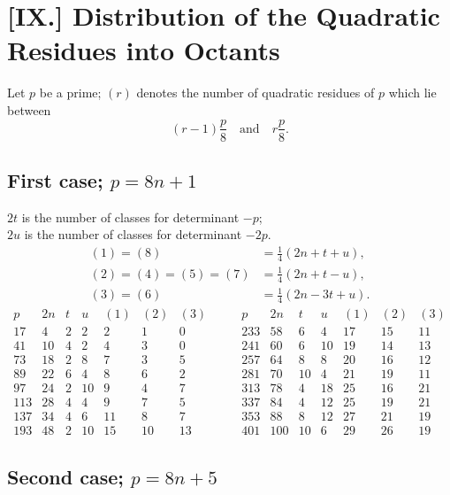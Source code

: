 \documentclass[12pt]{article}
\begin{document}
\section*{[IX.] Distribution of the Quadratic Residues into Octants}

Let $p$ be a prime; $(r)$ denotes the number of quadratic residues of $p$ which lie between
\[
(r-1)\frac{p}{8}\quad \text{and}\quad r\frac{p}{8}.
\]

\subsection*{First case; \(p=8n+1\)}

$2t$ is the number of classes for determinant $-p$;\\
$2u$ is the number of classes for determinant $-2p$.
\[
\begin{aligned}
(1)=(8)&=\frac14(2n+t+u),\\
(2)=(4)=(5)=(7)&=\frac14(2n+t-u),\\
(3)=(6)&=\frac14(2n-3t+u).
\end{aligned}
\]
{\scriptsize
\[
\begin{array}{r|r|r|r|r|r|r}
p&2n&t&u&(1)&(2)&(3)\\\hline
17&4&2&2&2&1&0\\
41&10&4&2&4&3&0\\
73&18&2&8&7&3&5\\
89&22&6&4&8&6&2\\
97&24&2&10&9&4&7\\
113&28&4&4&9&7&5\\
137&34&4&6&11&8&7\\
193&48&2&10&15&10&13
\end{array}
\qquad
\begin{array}{r|r|r|r|r|r|r}
p&2n&t&u&(1)&(2)&(3)\\\hline
233&58&6&4&17&15&11\\
241&60&6&10&19&14&13\\
257&64&8&8&20&16&12\\
281&70&10&4&21&19&11\\
313&78&4&18&25&16&21\\
337&84&4&12&25&19&21\\
353&88&8&12&27&21&19\\
401&100&10&6&29&26&19
\end{array}
\]
}

\subsection*{Second case; \(p=8n+5\)}
\end{document}

